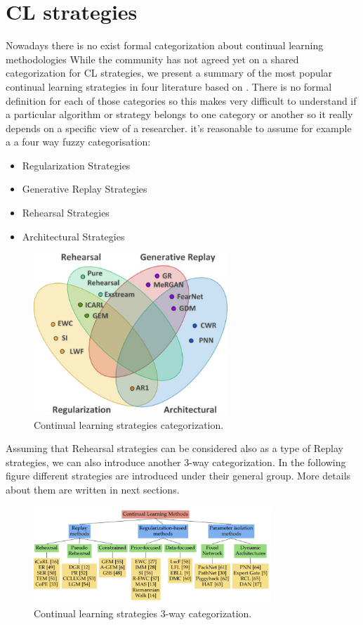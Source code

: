 \documentclass[english, LaM, oneside]{sapthesis}%
\begin{document}
\section{CL strategies}
Nowadays there is no exist formal categorization about continual learning methodologies
While the community has not agreed yet on a shared categorization for CL strategies, we present a summary of the most popular continual learning strategies in four literature based on \cite{kemker,zenke}. There is no formal definition for each of those categories so this makes very difficult to understand if a particular algorithm or strategy belongs to one category or another so it really depends on a specific view of a researcher. it's reasonable to assume for example a a four way fuzzy categorisation:
\begin{itemize}
    \item Regularization Strategies
    \item Generative Replay Strategies
    \item Rehearsal Strategies
    \item Architectural Strategies
\end{itemize}
\begin{figure}[!h]
            \centering
            \includegraphics[width=0.65\textwidth]{cl_strategies.jpg}
            \caption{Continual learning strategies categorization.}
            \label{fig:cl_strategies}
        \end{figure}

Assuming that Rehearsal strategies can be considered also as a type of Replay strategies, we can also introduce another 3-way categorization. In the following figure different strategies are introduced under their general group. More details about them are written in next sections.

\begin{figure}[!h]
            \centering
            \includegraphics[width=0.8\textwidth]{cl_3strategies.png}
            \caption{Continual learning strategies 3-way categorization.}
            \label{fig:cl_strategies}
        \end{figure}
        
\end{document}
